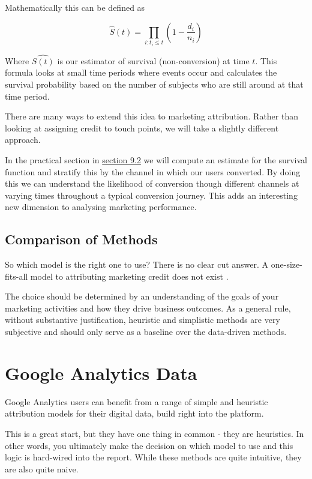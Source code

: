 \documentclass[]{book}
\begin{document}
Mathematically this can be defined as

\[
\hat{S}(t) = \prod\limits_{i: t_i \leq{t}} (1 - \frac{d_i}{n_i})
\]

Where \(\hat{S(t)}\) is our estimator of survival (non-conversion) at time \(t\). This
formula looks at small time periods where events occur and calculates the survival
probability based on the number of subjects who are still around at that time
period.

There are many ways to extend this idea to marketing attribution. Rather than
looking at assigning credit to touch points, we will take a slightly different approach.

In the practical section in \protect\hyperlink{survival-analysis}{section 9.2} we will compute an
estimate for the survival function and stratify this by the channel in which our
users converted. By doing this we can understand the likelihood of conversion
though different channels at varying times throughout a typical conversion journey.
This adds an interesting new dimension to analysing marketing performance.

\hypertarget{comparison-of-methods}{%
\section{Comparison of Methods}\label{comparison-of-methods}}

So which model is the right one to use? There is no clear cut answer. A one-size-fits-all
model to attributing marketing credit does not exist \citep{shao2011data}.

The choice should be determined by an understanding of the goals of your
marketing activities and how they drive business outcomes. As a general rule,
without substantive justification, heuristic and simplistic methods are
very subjective and should only serve as a baseline over the data-driven methods.

\hypertarget{google-analytics-data}{%
\chapter{Google Analytics Data}\label{google-analytics-data}}

Google Analytics users can benefit from a range of simple and heuristic attribution
models for their digital data, build right into the platform. \citep{noauthor_google_nodate}

This is a great start, but they have one thing in common - they are heuristics.
In other words, you ultimately make the decision on which model to use and this
logic is hard-wired into the report. While these methods are quite intuitive,
they are also quite naive.
\end{document}
